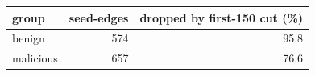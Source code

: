 \begin{tabular}{lrr}
\toprule
group & seed-edges & dropped by first-150 cut (\%) \\
\midrule
benign & 574 & 95.8 \\
malicious & 657 & 76.6 \\
\bottomrule
\end{tabular}
